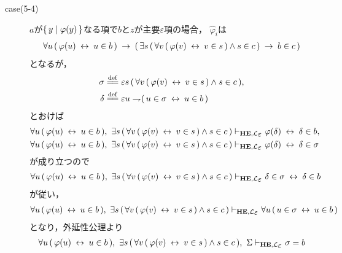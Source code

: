 \begin{metaprf}
\begin{description}
\begin{description}
					\item[case(5-4)] $a$が$\{\, y \mid \varphi(y)\, \}$なる項で$b$と$z$が主要$\varepsilon$項の場合，
						$\widehat{\varphi}_{i}$は
						\begin{align}
							\forall u\, (\, \varphi(u) \hspace{0.25em}\leftrightarrow\hspace{0.25em} u \in b\, ) 
							\hspace{0.25em}\rightarrow\hspace{0.25em} (\, \exists s\, (\, \forall v\, (\, \varphi(v) \hspace{0.25em}\leftrightarrow\hspace{0.25em} v \in s\, ) \wedge s \in c\, )
							\hspace{0.25em}\rightarrow\hspace{0.25em} b \in c\, )
						\end{align}
						となるが，
						\begin{align}
							\sigma &\defeq \varepsilon s\, (\, \forall v\, (\, \varphi(v) \lrarrow v \in s\, ) \wedge s \in c\, ), \\
							\delta &\defeq \varepsilon u \negation (\, u \in \sigma \lrarrow u \in b\, )
						\end{align}
						とおけば
						\begin{align}
							\forall u\, (\, \varphi(u) \lrarrow u \in b\, ),\ 
							\exists s\, (\, \forall v\, (\, \varphi(v) \lrarrow v \in s\, ) \wedge s \in c\, )
							&\provable{\mbox{{\bf HE}},\lang{\varepsilon}} \varphi(\delta) \lrarrow \delta \in b, \\
							\forall u\, (\, \varphi(u) \lrarrow u \in b\, ),\ 
							\exists s\, (\, \forall v\, (\, \varphi(v) \lrarrow v \in s\, ) \wedge s \in c\, )
							&\provable{\mbox{{\bf HE}},\lang{\varepsilon}} \varphi(\delta) \lrarrow \delta \in \sigma
						\end{align}
						が成り立つので
						\begin{align}
							\forall u\, (\, \varphi(u) \lrarrow u \in b\, ),\ 
							\exists s\, (\, \forall v\, (\, \varphi(v) \lrarrow v \in s\, ) \wedge s \in c\, )
							\provable{\mbox{{\bf HE}},\lang{\varepsilon}} \delta \in \sigma \lrarrow \delta \in b
						\end{align}
						が従い，
						\begin{align}
							\forall u\, (\, \varphi(u) \lrarrow u \in b\, ),\ 
							\exists s\, (\, \forall v\, (\, \varphi(v) \lrarrow v \in s\, ) \wedge s \in c\, )
							\provable{\mbox{{\bf HE}},\lang{\varepsilon}} \forall u\, (\, u \in \sigma \lrarrow u \in b\, )
						\end{align}
						となり，外延性公理より
						\begin{align}
							\forall u\, (\, \varphi(u) \lrarrow u \in b\, ),\ 
							\exists s\, (\, \forall v\, (\, \varphi(v) \lrarrow v \in s\, ) \wedge s \in c\, ),\ 
							\Sigma
							\provable{\mbox{{\bf HE}},\lang{\varepsilon}} \sigma = b
						\end{align}

\end{description}
\end{description}
\end{metaprf}
